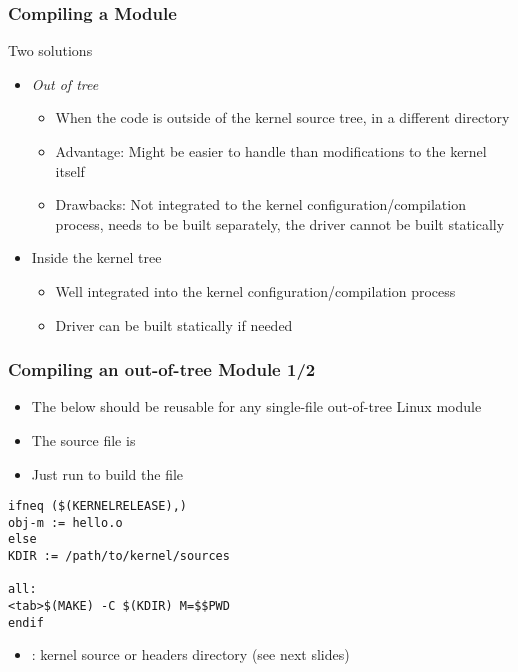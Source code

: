 \begin{frame}
  \frametitle{Compiling a Module}
  Two solutions
  \begin{itemize}
  \item \emph{Out of tree}
    \begin{itemize}
    \item When the code is outside of the kernel source tree, in a
      different directory
    \item Advantage: Might be easier to handle than modifications to
      the kernel itself
    \item Drawbacks: Not integrated to the kernel
      configuration/compilation process, needs to be built
      separately, the driver cannot be built statically
    \end{itemize}
  \item Inside the kernel tree
    \begin{itemize}
    \item Well integrated into the kernel configuration/compilation
       process
    \item Driver can be built statically if needed
    \end{itemize}
  \end{itemize}
\end{frame}

\begin{frame}[fragile]
  \frametitle{Compiling an out-of-tree Module 1/2}
  \begin{itemize}
  \item The below  should be reusable for any single-file
    out-of-tree Linux module
  \item The source file is 
  \item Just run  to build the  file
  \end{itemize}
{\footnotesize
\begin{block}{}
\begin{verbatim}
ifneq ($(KERNELRELEASE),)
obj-m := hello.o
else
KDIR := /path/to/kernel/sources

all:
<tab>$(MAKE) -C $(KDIR) M=$$PWD
endif
\end{verbatim}
\end{block}
}

\begin{itemize}
\item {}: kernel source or headers directory (see next slides)
\end{itemize}
\end{frame}

